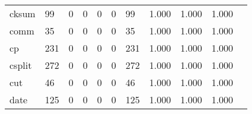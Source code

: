 \begin{longtable}{lp{1.20cm}p{1.20cm}p{1.20cm}p{1.20cm}p{1.20cm}p{1.20cm}p{1.20cm}p{1.20cm}p{1.20cm}p{1.20cm}}
cksum     &                                    99 &                                                  0 &                                                  0 &                                                  0 &                                                  0 &                                                 99 &                                         1.000 &                                              1.000 &                                              1.000 \\
comm      &                                    35 &                                                  0 &                                                  0 &                                                  0 &                                                  0 &                                                 35 &                                         1.000 &                                              1.000 &                                              1.000 \\
cp        &                                   231 &                                                  0 &                                                  0 &                                                  0 &                                                  0 &                                                231 &                                         1.000 &                                              1.000 &                                              1.000 \\
csplit    &                                   272 &                                                  0 &                                                  0 &                                                  0 &                                                  0 &                                                272 &                                         1.000 &                                              1.000 &                                              1.000 \\
cut       &                                    46 &                                                  0 &                                                  0 &                                                  0 &                                                  0 &                                                 46 &                                         1.000 &                                              1.000 &                                              1.000 \\
date      &                                   125 &                                                  0 &                                                  0 &                                                  0 &                                                  0 &                                                125 &                                         1.000 &                                              1.000 &                                              1.000 \\

\end{longtable}
